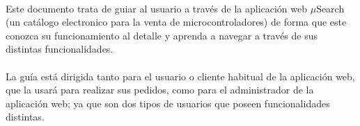 \paragraph{}Este documento trata de guiar al usuario a través de la aplicación web $\mu$Search (un catálogo electronico para la venta de microcontroladores) de forma que este conozca su funcionamiento al detalle y aprenda a navegar a través de sus distintas funcionalidades.

\paragraph{}La guía está dirigida tanto para el usuario o cliente habitual de la aplicación web, que la usará para realizar sus pedidos, como para el administrador de la aplicación web; ya que son dos tipos de usuarios que poseen funcionalidades distintas.